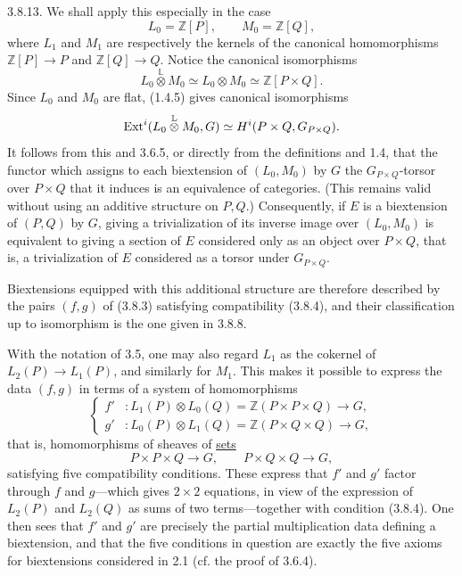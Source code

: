 3.8.13. We shall apply this especially in the case
\[
 L_0=\mathbb Z[P],\qquad M_0=\mathbb Z[Q],
\]
where $L_1$ and $M_1$ are respectively the kernels of the canonical
homomorphisms $\mathbb Z[P]\longrightarrow P$ and
$\mathbb Z[Q]\longrightarrow Q$.  Notice the canonical isomorphisms
\[
 L_0\mathbin{\overset{\mathbb L}{\otimes}}M_0
 \simeq L_0\otimes M_0
 \simeq\mathbb Z[P\times Q].
\]
Since $L_0$ and $M_0$ are flat, (1.4.5) gives canonical isomorphisms
\[
 \operatorname{Ext}^i(L_0\mathbin{\overset{\mathbb L}{\otimes}}M_0,G)
 \simeq H^i(P\times Q,G_{P\times Q}).
\]
It follows from this and 3.6.5, or directly from the definitions and
1.4, that the functor which assigns to each biextension of
$(L_0,M_0)$ by $G$ the $G_{P\times Q}$-torsor over $P\times Q$ that
it induces is an equivalence of categories.  (This remains valid
without using an additive structure on $P,Q$.)  Consequently, if
$E$ is a biextension of $(P,Q)$ by $G$, giving a trivialization of
its inverse image over $(L_0,M_0)$ is equivalent to giving a section
of $E$ considered only as an object over $P\times Q$, that is, a
trivialization of $E$ considered as a torsor under $G_{P\times Q}$.

Biextensions equipped with this additional structure are therefore
described by the pairs $(f,g)$ of (3.8.3) satisfying compatibility
(3.8.4), and their classification up to isomorphism is the one given
in 3.8.8.

With the notation of 3.5, one may also regard $L_1$ as the cokernel
of $L_2(P)\longrightarrow L_1(P)$, and similarly for $M_1$.  This
makes it possible to express the data $(f,g)$ in terms of a system
of homomorphisms
\[
\left\{
\begin{aligned}
 f'&:L_1(P)\otimes L_0(Q)
     =\mathbb Z(P\times P\times Q)\longrightarrow G,\\
 g'&:L_0(P)\otimes L_1(Q)
     =\mathbb Z(P\times Q\times Q)\longrightarrow G,
\end{aligned}
\right.
\]
that is, homomorphisms of sheaves of \underline{sets}
\[
 P\times P\times Q\longrightarrow G,\qquad
 P\times Q\times Q\longrightarrow G,
\]
satisfying five compatibility conditions.  These express that $f'$
and $g'$ factor through $f$ and $g$---which gives $2\times2$
equations, in view of the expression of $L_2(P)$ and $L_2(Q)$ as
sums of two terms---together with condition (3.8.4).  One then sees
that $f'$ and $g'$ are precisely the partial multiplication data
defining a biextension, and that the five conditions in question are
exactly the five axioms for biextensions considered in 2.1 (cf. the
proof of 3.6.4).

